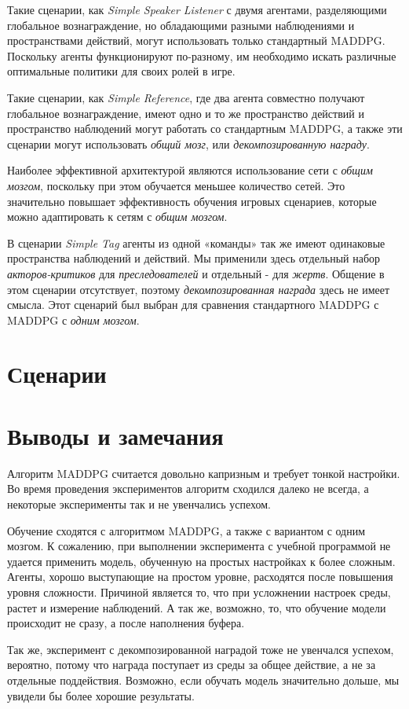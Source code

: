 Такие сценарии, как \textit{Simple Speaker Listener} с двумя агентами, разделяющими глобальное вознаграждение, но обладающими разными наблюдениями и пространствами действий, могут использовать только стандартный MADDPG. Поскольку агенты функционируют по-разному, им необходимо искать различные оптимальные политики для своих ролей в игре.

Такие сценарии, как \textit{Simple Reference}, где два агента совместно получают глобальное вознаграждение, имеют одно и то же пространство действий и пространство наблюдений могут работать со стандартным MADDPG, а также эти сценарии могут использовать \textit{общий мозг}, или \textit{декомпозированную награду}.

Наиболее эффективной архитектурой являются использование сети с \textit{общим мозгом}, поскольку при этом обучается меньшее количество сетей. Это значительно повышает эффективность обучения игровых сценариев, которые можно адаптировать к сетям с \textit{общим мозгом}. 

В сценарии \textit{Simple Tag} агенты из одной «команды» так же имеют одинаковые пространства наблюдений и действий. Мы применили здесь отдельный набор \textit{акторов-критиков} для \textit{преследователей} и отдельный - для \textit{жертв}. Общение в этом сценарии отсутствует, поэтому \textit{декомпозированная награда} здесь не имеет смысла. Этот сценарий был выбран для сравнения стандартного MADDPG с MADDPG с \textit{одним мозгом}.

\newpage

\section{Сценарии}






\section{Выводы и замечания}

Алгоритм MADDPG считается довольно капризным и требует тонкой настройки. Во время проведения экспериментов алгоритм сходился далеко не всегда, а некоторые эксперименты так и не увенчались успехом.

Обучение сходятся с алгоритмом MADDPG, а также с вариантом с одним мозгом. К сожалению, при выполнении эксперимента с учебной программой не удается применить модель, обученную на простых настройках к более сложным. Агенты, хорошо выступающие на простом уровне, расходятся после повышения уровня сложности. Причиной является то, что при усложнении настроек среды, растет и измерение наблюдений. А так же, возможно, то, что обучение модели происходит не сразу, а после наполнения буфера.

Так же, эксперимент с декомпозированной наградой тоже не увенчался успехом, вероятно, потому что награда поступает из среды за общее действие, а не за отдельные поддействия. Возможно, если обучать модель значительно дольше, мы увидели бы более хорошие результаты.


\newpage
